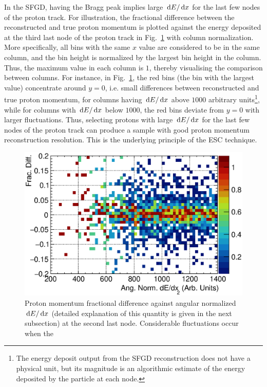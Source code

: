      In the SFGD, having the Bragg peak implies large $\,\textrm{d}E/\,\textrm{d}x$ for the last few nodes of the proton track.
     For illustration, the fractional difference between the reconstructed and true proton momentum is plotted against the energy deposited at the third last node of the proton track in Fig.~\ref{fig:dedx-pprres-eg} with column normalization.
     More specifically, all bins with the same $x$ value are considered to be in the same column, and the bin height is normalized by the largest bin height in the column.
     Thus, the maximum value in each column is $1$, thereby visualising the comparison between columns.
     For instance, in Fig.~\ref{fig:dedx-pprres-eg}, the red bins (the bin with the largest value) concentrate around $y=0$, i.e. small differences between reconstructed and true proton momentum, for columns having $\,\textrm{d}E/\,\textrm{d}x$ above $1000$ arbitrary units\footnote{ 
     The energy deposit output from the SFGD reconstruction does not have a physical unit, but its magnitude is an algorithmic estimate of the energy deposited by the particle at each node.}, while for columns with $\,\textrm{d}E/\,\textrm{d}x$ below $1000$, the red bins deviate from $y=0$ with larger fluctuations.
     Thus, selecting protons with large $\,\textrm{d}E/\,\textrm{d}x$ for the last few nodes of the proton track can produce a sample with good proton momentum reconstruction resolution.
     This is the underlying principle of the ESC technique.
    \begin{figure}[!h]
        \centering
        \includegraphics[width=\sgfidwid\linewidth]{figures/sel/fig51.eps}
        \caption{Proton momentum fractional difference against angular normalized $\,\textrm{d}E/\,\textrm{d}x$ (detailed explanation of this quantity is given in the next subsection) at the second last node. Considerable fluctuations occur when the }
        \label{fig:dedx-pprres-eg}
    \end{figure}
    

